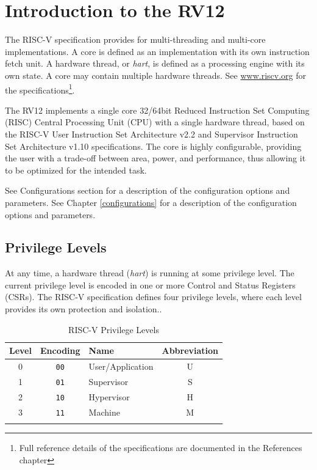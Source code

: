 \chapter{Introduction to the RV12} \label{introduction-to-the-rv12}

The RISC-V specification provides for multi-threading and multi-core
implementations.  A core is defined as an implementation with its own
instruction fetch unit.  A hardware thread, or \emph{hart}, is defined as a
processing engine with its own state.  A core may contain multiple hardware
threads.  See \href{http://www.riscv.org}{www.riscv.org} for the
specifications\footnote{Full reference details of the specifications are
documented in the References chapter}.

The RV12 implements a single core 32/64bit Reduced Instruction Set Computing
(RISC) Central Processing Unit (CPU) with a single hardware thread, based on
the RISC-V User Instruction Set Architecture v2.2 and Supervisor Instruction
Set Architecture v1.10 specifications.  The core is highly configurable,
providing the user with a trade-off between area, power, and performance, thus
allowing it to be optimized for the intended task.

\ifdefined\MARKDOWN
	See Configurations section for a description of the configuration options and parameters.
\else
	See Chapter \ref{configurations} for a description of the configuration options and parameters.
\fi

\section{Privilege Levels}\label{privilege-levels}

At any time, a hardware thread (\emph{hart}) is running at some privilege
level.  The current privilege level is encoded in one or more Control and
Status Registers (CSRs).  The RISC-V specification defines four privilege
levels, where each level provides its own protection and isolation..

\begin{longtable}[]{@{}cclc@{}}
\toprule
	Level & Encoding    & Name             & Abbreviation\tabularnewline
\midrule
\endhead
	0     & \texttt{00} & User/Application & U\tabularnewline
	1     & \texttt{01} & Supervisor       & S\tabularnewline
	2     & \texttt{10} & Hypervisor       & H\tabularnewline
	3     & \texttt{11} & Machine          & M\tabularnewline
\bottomrule
\caption{RISC-V Privilege Levels}
\label{tab:riscv-priv-levels}
\end{longtable}

